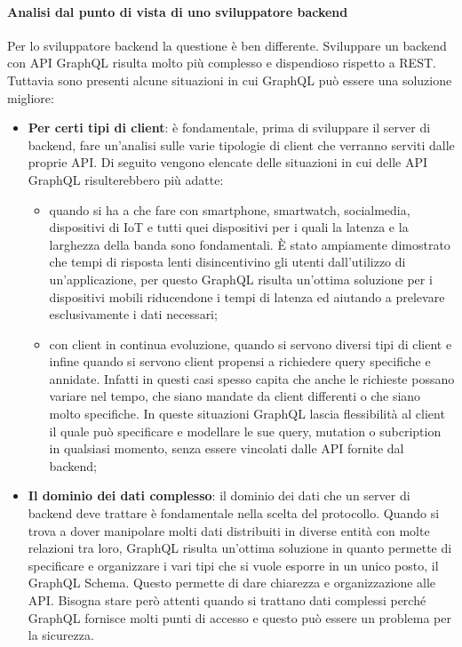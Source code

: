 \paragraph{Analisi dal punto di vista di uno sviluppatore backend}
Per lo sviluppatore backend la questione è ben differente. Sviluppare un backend con API GraphQL risulta molto più complesso e dispendioso rispetto a REST. Tuttavia sono presenti alcune situazioni in cui GraphQL può essere una soluzione migliore:
\begin{itemize}
  \item \textbf{Per certi tipi di client}: è fondamentale, prima di sviluppare il server di backend, fare un'analisi sulle varie tipologie di client che verranno serviti dalle proprie API. Di seguito vengono elencate delle situazioni in cui delle API GraphQL risulterebbero più adatte:
  \begin{itemize}
    \item quando si ha a che fare con smartphone, smartwatch, socialmedia, dispositivi di IoT  e tutti quei dispositivi per i quali la latenza e la larghezza della banda sono fondamentali. È stato ampiamente dimostrato che tempi di risposta lenti disincentivino gli utenti dall'utilizzo di un'applicazione, per questo GraphQL risulta un'ottima soluzione per i dispositivi mobili riducendone i tempi di latenza ed aiutando a prelevare esclusivamente i dati necessari;
    \item con client in continua evoluzione, quando si servono diversi tipi di client e infine quando si servono client propensi a richiedere query specifiche e annidate. Infatti in questi casi spesso capita che anche le richieste possano variare nel tempo, che siano mandate da client differenti o che siano molto specifiche. In queste situazioni GraphQL lascia flessibilità al client il quale può specificare e modellare le sue query, mutation o subcription in qualsiasi momento, senza essere vincolati dalle API fornite dal backend;
  \end{itemize}
  \item \textbf{Il dominio dei dati complesso}: il dominio dei dati che un server di backend deve trattare è fondamentale nella scelta del protocollo. Quando si trova a dover manipolare molti dati distribuiti in diverse entità con molte relazioni tra loro, GraphQL risulta un'ottima soluzione in quanto permette di specificare e organizzare i vari tipi che si vuole esporre in un unico posto, il GraphQL Schema. Questo permette di dare chiarezza e organizzazione alle API. Bisogna stare però attenti quando si trattano dati complessi perché GraphQL fornisce molti punti di accesso e questo può essere un problema per la sicurezza.

\end{itemize}
